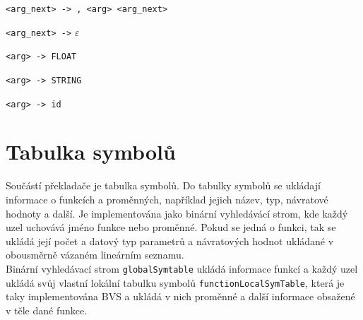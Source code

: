 \documentclass[a4paper, 12pt]{article}
\begin{document}
\begin{enumerate}[noitemsep]
{            \item \verb|<arg_next> -> , <arg> <arg_next>|
            \item \verb|<arg_next> ->| $\varepsilon$
            \item \verb|<arg> -> FLOAT|
            \item \verb|<arg> -> STRING|
            \item \verb|<arg> -> id| 
            }
            
            
        \end{enumerate} 

\newpage

\section{Tabulka symbolů}
Součástí překladače je tabulka symbolů. Do tabulky symbolů se ukládají informace o funkcích a proměnných, například jejich název, typ, návratové hodnoty a další. Je implementována jako binární vyhledávácí strom, kde každý uzel uchovává jméno funkce nebo proměnné. Pokud se jedná o funkci, tak se ukládá její počet a datový typ parametrů a návratových hodnot ukládané v obousměrně vázaném lineárním seznamu. \\
\newline
Binární vyhledávací strom \verb|globalSymtable| ukládá informace funkcí a každý uzel ukládá svůj vlastní lokální tabulku symbolů \verb|functionLocalSymTable|, která je taky implementována BVS a ukládá v nich proměnné a další informace obsažené v těle dané funkce. 
\end{document}
